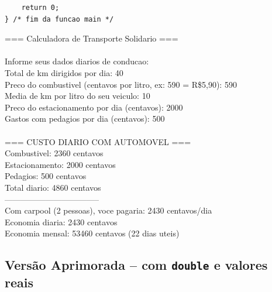 \documentclass[12pt,a4paper]{article}
\begin{document}
\begin{respostabox}
\begin{lstlisting}
    return 0;
} /* fim da funcao main */
\end{lstlisting}

\begin{saida}
=== Calculadora de Transporte Solidario ===\\
\\
Informe seus dados diarios de conducao:\\
Total de km dirigidos por dia: 40\\
Preco do combustivel (centavos por litro, ex: 590 = R\$5,90): 590\\
Media de km por litro do seu veiculo: 10\\
Preco do estacionamento por dia (centavos): 2000\\
Gastos com pedagios por dia (centavos): 500\\
\\
=== CUSTO DIARIO COM AUTOMOVEL ===\\
Combustivel:     2360 centavos\\
Estacionamento:  2000 centavos\\
Pedagios:        500 centavos\\
Total diario:    4860 centavos\\
-----------------------------------\\
Com carpool (2 pessoas), voce pagaria: 2430 centavos/dia\\
Economia diaria:   2430 centavos\\
Economia mensal:   53460 centavos (22 dias uteis)
\end{saida}
\end{respostabox}

\subsection{Versão Aprimorada -- com \texttt{double} e valores reais}
\end{document}
